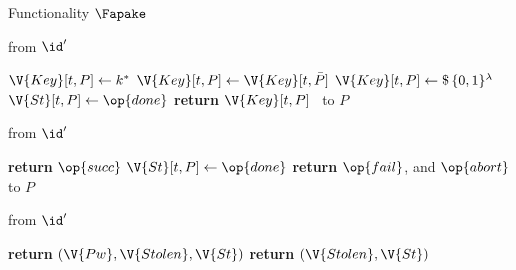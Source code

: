 \begin{interface}[nofloat]{Functionality $\Fapake$ \\
}
{\begin{multicols}{2}
 \quad from $\id'$
\begin{algorithmic}[1]
\algcont
{}
  \State $\V{Key}[t,P] \gets k^{*}$ \label{ln:apakeadvkey}
\EndIf
{}
  \State $\V{Key}[t,P] \gets \V{Key}[t,\bar{P}]$ \label{ln:apakematch}
\EndIf
{}
  \State $\V{Key}[t,P] \gets \$\,\{0,1\}^{\lambda}$ \label{ln:apakerand}
\EndIf
\State $\V{St}[t,P] \gets \op{done}$
\State \textbf{return} $\V{Key}[t,P]$ \ to $P$
\algsave
\end{algorithmic}
\vspace{1.4ex}

 \quad from $\id'$
\begin{algorithmic}[1]
\algcont
{}
  \State \textbf{return} $\op{succ}$ \label{ln:apakenoabort}
\EndIf
\State $\V{St}[t,P] \gets \op{done}$
\State \textbf{return} $\op{fail}$, and $\op{abort}$ to $P$
\algsave
\end{algorithmic}
\vspace{1.4ex}

 \quad from $\id'$
\begin{algorithmic}[1]
\algcont
{}
  \State \textbf{return} $(\V{Pw}, \V{Stolen}, \V{St})$ \label{ln:apakeleaks}
\EndIf
\State \textbf{return} $(\V{Stolen}, \V{St})$ \label{ln:apakeleak}
\algsave
\end{algorithmic}
\end{multicols}}
\end{interface}
